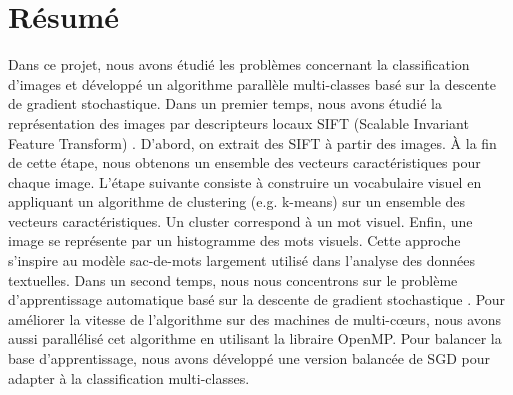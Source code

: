 \clearpage
\thispagestyle{plain}
\chapter*{Résumé}

Dans ce projet, nous avons étudié les problèmes concernant la classification d'images et développé un algorithme parallèle multi-classes basé sur la descente de gradient stochastique. Dans un premier temps, nous avons étudié la représentation des images par descripteurs locaux SIFT (Scalable Invariant Feature Transform) \cite{low99}. D'abord, on extrait des SIFT à partir des images. À la fin de cette étape, nous obtenons un ensemble des vecteurs caractéristiques pour chaque image. L'étape suivante consiste à construire un vocabulaire visuel en appliquant un algorithme de clustering (e.g. k-means) sur un ensemble des vecteurs caractéristiques. Un cluster correspond à un mot visuel. Enfin, une image se représente par un histogramme des mots visuels. Cette approche s'inspire au modèle sac-de-mots largement utilisé dans l'analyse des données textuelles. Dans un second temps, nous nous concentrons sur le problème d'apprentissage automatique basé sur la descente de gradient stochastique \cite{sss07}. Pour améliorer la vitesse de l'algorithme sur des machines de multi-cœurs, nous avons aussi parallélisé cet algorithme en utilisant la libraire OpenMP. Pour balancer la base d'apprentissage, nous avons développé une version balancée de SGD pour adapter à la classification multi-classes.


